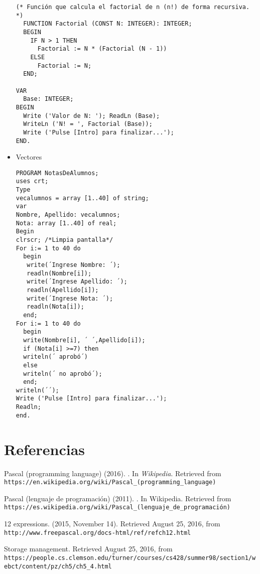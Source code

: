 \documentclass{IEEEtran}
\begin{document}
\begin{itemize}
\begin{lstlisting}
(* Función que calcula el factorial de n (n!) de forma recursiva. *)
  FUNCTION Factorial (CONST N: INTEGER): INTEGER;
  BEGIN
    IF N > 1 THEN
      Factorial := N * (Factorial (N - 1))
    ELSE
      Factorial := N;
  END;

VAR
  Base: INTEGER;
BEGIN
  Write ('Valor de N: '); ReadLn (Base);
  WriteLn ('N! = ', Factorial (Base));
  Write ('Pulse [Intro] para finalizar...');
END.
\end{lstlisting}
\item Vectores
\begin{lstlisting}
PROGRAM NotasDeAlumnos;
uses crt;
Type
vecalumnos = array [1..40] of string;
var
Nombre, Apellido: vecalumnos;
Nota: array [1..40] of real;
Begin
clrscr; /*Limpia pantalla*/
For i:= 1 to 40 do
  begin
   write(´Ingrese Nombre: ´);
   readln(Nombre[i]);
   write(´Ingrese Apellido: ´);
   readln(Apellido[i]);
   write(´Ingrese Nota: ´);
   readln(Nota[i]);
  end;
For i:= 1 to 40 do
  begin
  write(Nombre[i], ´ ´,Apellido[i]);
  if (Nota[i] >=7) then
  writeln(´ aprobó´)
  else
  writeln(´ no aprobó´);
  end;
writeln(´´);
Write ('Pulse [Intro] para finalizar...');
Readln;
end.
\end{lstlisting}
\end{itemize}

\section{Referencias}

\begin{thebibliography}{99}

 Pascal (programming language) (2016). . In \emph{Wikipedia}. Retrieved from \texttt{https://en.wikipedia.org/wiki/Pascal\_(programming\_language)}

 Pascal (lenguaje de programación) (2011). . In Wikipedia. Retrieved from \texttt{https://es.wikipedia.org/wiki/Pascal\_(lenguaje\_de\_programación)}

 12 expressions. (2015, November 14). Retrieved August 25, 2016, from \texttt{http://www.freepascal.org/docs-html/ref/refch12.html}

 Storage management. Retrieved August 25, 2016, from \texttt{https://people.cs.clemson.edu/\~turner/courses/cs428/summer98/section1/webct/content/pz/ch5/ch5\_4.html}

\end{thebibliography}
\end{document}
